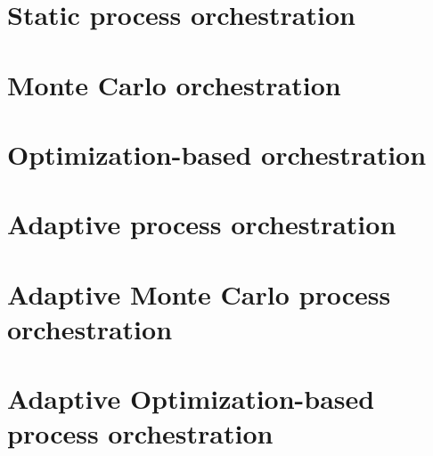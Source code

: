 \section{Static process orchestration}



\section{Monte Carlo orchestration}

\section{Optimization-based orchestration}

\section{Adaptive process orchestration}

\section{Adaptive Monte Carlo process orchestration}

\section{Adaptive Optimization-based process orchestration}



